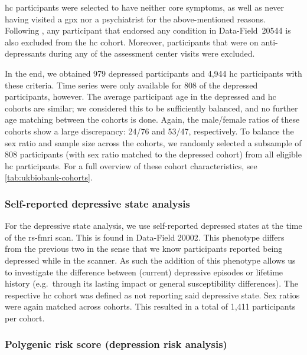 \gls{hc} participants were selected to have neither core symptoms, as well as never having visited a \gls{gpx} nor a psychiatrist for the above-mentioned reasons.
Following \textcite{Glanville2021}, any participant that endorsed any condition in Data-Field~20544 is also excluded from the \gls{hc} cohort.
Moreover, participants that were on anti-depressants during any of the assessment center visits were excluded.

In the end, we obtained 979 depressed participants and 4,944 \gls{hc} participants with these criteria.
Time series were only available for 808 of the depressed participants, however.
The average participant age in the depressed and \gls{hc} cohorts are similar; we considered this to be sufficiently balanced, and no further age matching between the cohorts is done.
Again, the male/female ratios of these cohorts show a large discrepancy: 24/76 and 53/47, respectively.
To balance the sex ratio and sample size across the cohorts, we randomly selected a subsample of 808 participants (with sex ratio matched to the depressed cohort) from all eligible \gls{hc} participants.
For a full overview of these cohort characteristics, see \cref{tab:ukbiobank-cohorts}.

\subsubsection{Self-reported depressive state analysis}

For the depressive state analysis, we use self-reported depressed states at the time of the \gls{rs-fmri} scan.
This is found in Data-Field 20002.
This phenotype differs from the previous two in the sense that we know participants reported being depressed while in the scanner.
As such the addition of this phenotype allows us to investigate the difference between (current) depressive episodes or lifetime history (e.g.~through its lasting impact or general susceptibility differences).
The respective \gls{hc} cohort was defined as not reporting said depressive state.
%
Sex ratios were again matched across cohorts.
This resulted in a total of 1,411 participants per cohort.

\subsubsection{Polygenic risk score (depression risk analysis)}


